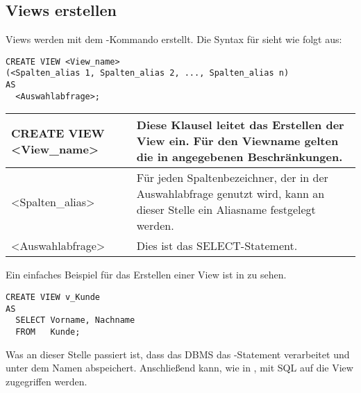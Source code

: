 \subsection{Views erstellen}
Views werden mit dem -Kommando erstellt. Die Syntax für  sieht wie folgt aus:
\begin{lstlisting}[language=oracle_sql,caption={Die Syntax von CREATE VIEW},label=sql08_24]
CREATE VIEW <View_name>
(<Spalten_alias 1, Spalten_alias 2, ..., Spalten_alias n)
AS
  <Auswahlabfrage>;
        \end{lstlisting}
\begin{center}
    \label{createviewsyntax}
    \begin{small}
        \tabletail{
            \hline
        }
        \tablelasttail{
            \hline
        }
        \begin{supertabular}{|l|p{9.45cm}|}
            CREATE VIEW <View\_name> & Diese Klausel leitet das Erstellen der View ein. Für den Viewname gelten die in  angegebenen Beschränkungen. \\
            \hline
            <Spalten\_alias> & Für jeden Spaltenbezeichner, der in der Auswahlabfrage genutzt wird, kann an dieser Stelle ein Aliasname festgelegt werden.\\
            \hline
            <Auswahlabfrage> & Dies ist das SELECT-Statement. \\
        \end{supertabular}
    \end{small}
\end{center}
Ein einfaches Beispiel für das Erstellen einer View ist in  zu sehen.
\begin{lstlisting}[language=oracle_sql,caption={Eine einfache View},label=sql08_25]
CREATE VIEW v_Kunde
AS
  SELECT Vorname, Nachname
  FROM   Kunde;
        \end{lstlisting}
Was an dieser Stelle passiert ist, dass das DBMS das \SELECT-Statement verarbeitet und unter dem Namen  abspeichert. Anschließend kann, wie in , mit SQL auf die View zugegriffen werden.

